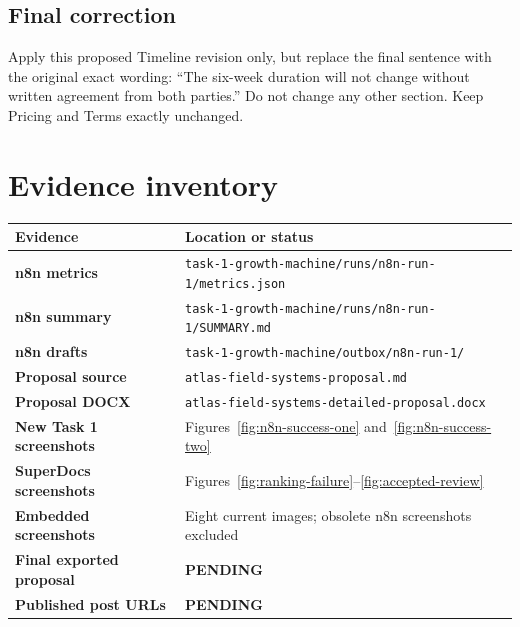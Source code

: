 \documentclass[11pt,a4paper]{article}
\newcommand{\pathcode}[1]{\texttt{#1}}
\newcommand{\pending}{\textcolor{Bad}{\textbf{PENDING}}}
\newcommand{\evidencebox}[1]{\begin{center}\colorbox{Soft}{\parbox{0.92\textwidth}{#1}}\end{center}}
\begin{document}
\subsection{Final correction}

\evidencebox{Apply this proposed Timeline revision only, but replace the final sentence with the original exact wording: ``The six-week duration will not change without written agreement from both parties.'' Do not change any other section. Keep Pricing and Terms exactly unchanged.}

\section{Evidence inventory}

\begin{tabularx}{\textwidth}{>{\bfseries}p{} X}
\toprule
Evidence & Location or status \\
\midrule
n8n metrics & \pathcode{task-1-growth-machine/runs/n8n-run-1/metrics.json} \\
n8n summary & \pathcode{task-1-growth-machine/runs/n8n-run-1/SUMMARY.md} \\
n8n drafts & \pathcode{task-1-growth-machine/outbox/n8n-run-1/} \\
Proposal source & \pathcode{atlas-field-systems-proposal.md} \\
Proposal DOCX & \pathcode{atlas-field-systems-detailed-proposal.docx} \\
New Task 1 screenshots & Figures~\ref{fig:n8n-success-one} and~\ref{fig:n8n-success-two} \\
SuperDocs screenshots & Figures~\ref{fig:ranking-failure}--\ref{fig:accepted-review} \\
Embedded screenshots & Eight current images; obsolete n8n screenshots excluded \\
Final exported proposal & \pending \\
Published post URLs & \pending \\
\bottomrule
\end{tabularx}
\end{document}
